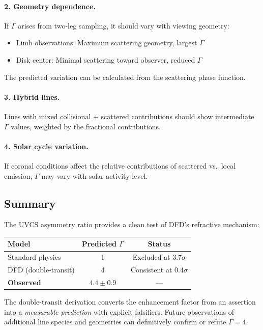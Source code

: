 \paragraph{2. Geometry dependence.}
If $\Gamma$ arises from two-leg sampling, it should vary with viewing geometry:
\begin{itemize}[nosep]
\item Limb observations: Maximum scattering geometry, largest $\Gamma$
\item Disk center: Minimal scattering toward observer, reduced $\Gamma$
\end{itemize}
The predicted variation can be calculated from the scattering phase function.

\paragraph{3. Hybrid lines.}
Lines with mixed collisional + scattered contributions should show intermediate 
$\Gamma$ values, weighted by the fractional contributions.

\paragraph{4. Solar cycle variation.}
If coronal conditions affect the relative contributions of scattered vs.\ local 
emission, $\Gamma$ may vary with solar activity level.

\subsection{Summary}

The UVCS asymmetry ratio provides a clean test of DFD's refractive mechanism:

\begin{center}
\begin{tabular}{lcc}
\toprule
\textbf{Model} & \textbf{Predicted $\Gamma$} & \textbf{Status} \\
\midrule
Standard physics & 1 & Excluded at $3.7\sigma$ \\
DFD (double-transit) & 4 & Consistent at $0.4\sigma$ \\
\midrule
\textbf{Observed} & $4.4 \pm 0.9$ & --- \\
\bottomrule
\end{tabular}
\end{center}

The double-transit derivation converts the enhancement factor from an assertion 
into a \emph{measurable prediction} with explicit falsifiers. Future observations 
of additional line species and geometries can definitively confirm or refute 
$\Gamma = 4$.
